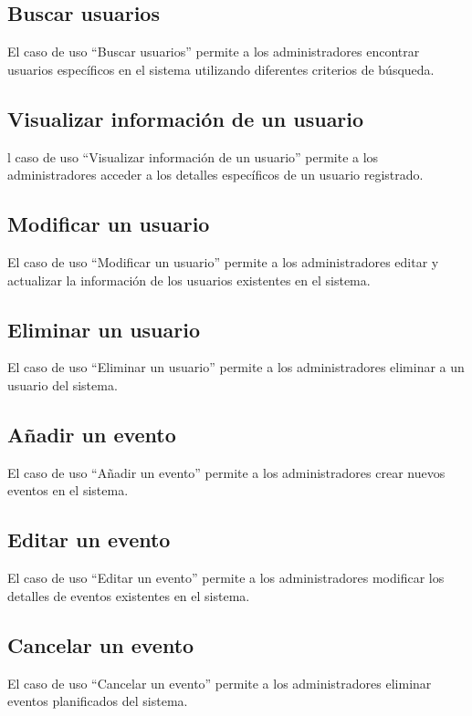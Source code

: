 \subsection{Buscar usuarios}
El caso de uso “Buscar usuarios” permite a los administradores encontrar usuarios específicos en el sistema utilizando diferentes criterios de búsqueda.

\subsection{Visualizar información de un usuario}
l caso de uso “Visualizar información de un usuario” permite a los administradores acceder a los detalles específicos de un usuario registrado.

\subsection{Modificar un usuario}
El caso de uso “Modificar un usuario” permite a los administradores editar y actualizar la información de los usuarios existentes en el sistema.

\subsection{Eliminar un usuario}
El caso de uso “Eliminar un usuario” permite a los administradores eliminar a un usuario del sistema.

\subsection{Añadir un evento}
El caso de uso “Añadir un evento” permite a los administradores crear nuevos eventos en el sistema.

\subsection{Editar un evento}
El caso de uso “Editar un evento” permite a los administradores modificar los detalles de eventos existentes en el sistema.

\subsection{Cancelar un evento}
El caso de uso “Cancelar un evento” permite a los administradores eliminar eventos planificados del sistema.

